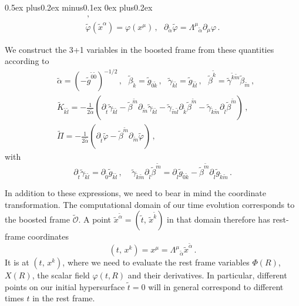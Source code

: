\documentclass[]{iopart}
\begin{document}
\begin{list}{\rm{\bf ()}}{
                
             \parsep0.5ex plus0.2ex minus0.1ex \itemsep0ex plus0.2ex}
\begin{gather}
    \,, \nonumber\\
     \tilde{\varphi}(\tilde{x}^{\alpha}) = \varphi(x^{\mu})\,,~~~
    \partial_{\tilde{\alpha}}\tilde{\varphi}=
    \Lambda^{\mu}{}_{\tilde{\alpha}} \partial_{\mu}\varphi\,.
  \end{gather}
  \item We construct the 3+1 variables in the boosted frame from these
  quantities according to
  \begin{align}
    &\tilde{\alpha} = \left(-\tilde{g}^{\tilde{0}\tilde{0}}\right)^{-1/2}
    \,,~~~
    \tilde{\beta}_{\tilde{k}}=\tilde{g}_{\tilde{0}\tilde{k}}
    \,,~~~
    \tilde{\gamma}_{\tilde{k}\tilde{l}}=\tilde{g}_{\tilde{k}\tilde{l}}
    \,,~~~
    \tilde{\beta}^{\tilde{k}}=\tilde{\gamma}^{\tilde{k}\tilde{m}}
    \tilde{\beta}_{\tilde{m}}
    \,, \\
    & \tilde{K}_{\tilde{k}\tilde{l}}=
    -\frac{1}{2\tilde{\alpha}}
    \left(
    \partial_{\tilde{t}}\tilde{\gamma}_{\tilde{k}\tilde{l}}
    -\tilde{\beta}^{\tilde{m}}\partial_{\tilde{m}}\tilde{\gamma}_{\tilde{k}\tilde{l}}
    -\tilde{\gamma}_{\tilde{m}\tilde{l}}\partial_{\tilde{k}}\tilde{\beta}^{\tilde{m}}
    -\tilde{\gamma}_{\tilde{k}\tilde{m}}\partial_{\tilde{l}}\tilde{\beta}^{\tilde{m}}
    \right)\,, \nonumber \\
    &\tilde{\Pi} = -\frac{1}{2\tilde{\alpha}}
    \left(
    \partial_{\tilde{t}}\tilde{\varphi}
    - \tilde{\beta}^{\tilde{m}} \partial_{\tilde{m}}\tilde{\varphi}
    \right)\,,
  \end{align}
  with
  \begin{equation}
    \partial_{\tilde{t}}\tilde{\gamma}_{\tilde{k}\tilde{l}}=
    \partial_{\tilde{0}}\tilde{g}_{\tilde{k}\tilde{l}}
    \,,~~~~~
    \tilde{\gamma}_{\tilde{k}\tilde{m}}
    \partial_{\tilde{l}}\tilde{\beta}^{\tilde{m}}
    =
    \partial_{\tilde{l}}\tilde{g}_{\tilde{0}\tilde{k}}
    - \tilde{\beta}^{\tilde{m}}
    \partial_{\tilde{l}}\tilde{g}_{\tilde{k}\tilde{m}}\,.
  \end{equation}
  \item In addition to these expressions, we need to bear in mind
  the coordinate transformation. The computational domain of our
  time evolution corresponds to the boosted frame $\tilde{\mathcal{O}}$.
  A point $\tilde{x}^{\tilde{\alpha}}=(\tilde{t},\,\tilde{x}^{\tilde{k}})$
  in that domain therefore has rest-frame coordinates
  \begin{equation}
     (t,\,x^k) = x^{\mu} = \Lambda^{\mu}{}_{\tilde{\alpha}}
        \tilde{x}^{\tilde{\alpha}}\,.
  \end{equation}
  It is at $(t,\,x^k)$, where we need to evaluate the rest frame
  variables $\Phi(R)$, $X(R)$, the scalar field $\varphi(t,R)$ and
  their derivatives. In particular, different points on our initial
  hypersurface $\tilde{t}=0$ will in general correspond to different
  times $t$ in the rest frame.
\end{list}
%
\end{document}

